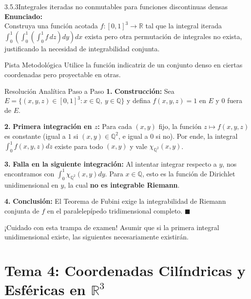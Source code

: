 \documentclass[11pt,a4paper]{article}
\begin{document}
\begin{nivelbox}{3.5.3}{Integrales iteradas no conmutables para funciones discontinuas densas}
\textbf{Enunciado:}\\
Construya una función acotada $f: [0,1]^3 \to \mathbb{R}$ tal que la integral iterada $\int_0^1 \left( \int_0^1 \left( \int_0^1 f \, dz \right) dy \right) dx$ exista pero otra permutación de integrales no exista, justificando la necesidad de integrabilidad conjunta.

\begin{observacionbox}{Pista Metodológica}
Utilice la función indicatriz de un conjunto denso en ciertas coordenadas pero proyectable en otras.
\end{observacionbox}

\begin{ejerciciobox}{Resolución Analítica Paso a Paso}
\smallskip\noindent\textbf{1.} \textbf{Construcción:}
Sea $E = \{ (x, y, z) \in [0,1]^3 : x \in \mathbb{Q}, \ y \in \mathbb{Q} \}$ y defina $f(x,y,z) = 1$ en $E$ y $0$ fuera de $E$.

\smallskip\noindent\textbf{2.} \textbf{Primera integración en $z$:}
Para cada $(x,y)$ fijo, la función $z \mapsto f(x,y,z)$ es constante (igual a $1$ si $(x,y) \in \mathbb{Q}^2$, e igual a $0$ si no). Por ende, la integral $\int_0^1 f(x,y,z) dz$ existe para todo $(x,y)$ y vale $\chi_{\mathbb{Q}^2}(x,y)$.

\smallskip\noindent\textbf{3.} \textbf{Falla en la siguiente integración:}
Al intentar integrar respecto a $y$, nos encontramos con $\int_0^1 \chi_{\mathbb{Q}^2}(x,y) dy$. Para $x \in \mathbb{Q}$, esto es la función de Dirichlet unidimensional en $y$, la cual \textbf{no es integrable Riemann}.

\smallskip\noindent\textbf{4.} \textbf{Conclusión:}
El Teorema de Fubini exige la integrabilidad de Riemann conjunta de $f$ en el paralelepípedo tridimensional completo. $\blacksquare$
\end{ejerciciobox}

\begin{errorbox}{¡Cuidado con esta trampa de examen!}
Asumir que si la primera integral unidimensional existe, las siguientes necesariamente existirán.
\end{errorbox}
\end{nivelbox}
\bigskip


\section{Tema 4: Coordenadas Cilíndricas y Esféricas en $\mathbb{R}^3$}
\end{document}
